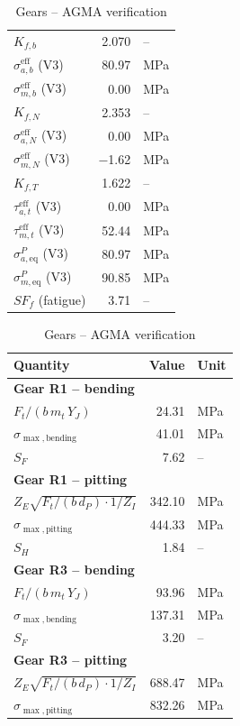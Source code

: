 \documentclass[11pt,a4paper]{article}
\begin{document}
\begin{table}[H]
\begin{minipage}[t]{0.48\textwidth}
\begin{tabular}{lrl}
$K_{f,b}$ & 2.070 & -- \\
$\sigma_{a,b}^{\mathrm{eff}}$ (V3) & 80.97 & MPa \\
$\sigma_{m,b}^{\mathrm{eff}}$ (V3) & 0.00 & MPa \\
$K_{f,N}$ & 2.353 & -- \\
$\sigma_{a,N}^{\mathrm{eff}}$ (V3) & 0.00 & MPa \\
$\sigma_{m,N}^{\mathrm{eff}}$ (V3) & \ensuremath{-}1.62 & MPa \\
$K_{f,T}$ & 1.622 & -- \\
$\tau_{a,t}^{\mathrm{eff}}$ (V3) & 0.00 & MPa \\
$\tau_{m,t}^{\mathrm{eff}}$ (V3) & 52.44 & MPa \\
$\sigma_{a,\mathrm{eq}}^{P}$ (V3) & 80.97 & MPa \\
$\sigma_{m,\mathrm{eq}}^{P}$ (V3) & 90.85 & MPa \\
$SF_f$ (fatigue) & 3.71 & -- \\
\bottomrule
\end{tabular}
\end{minipage}\hfill
\begin{minipage}[t]{0.48\textwidth}\centering
\caption*{Gears -- AGMA verification}
\begin{tabular}{lrl}
\toprule
Quantity & Value & Unit \\
\midrule
\multicolumn{3}{l}{\textbf{Gear R1 -- bending}} \\
$F_t/(b\,m_t\,Y_J)$ & 24.31 & MPa \\
$\sigma_{\max,\mathrm{bending}}$ & 41.01 & MPa \\
$S_F$ & 7.62 & -- \\
\multicolumn{3}{l}{\textbf{Gear R1 -- pitting}} \\
$Z_E\sqrt{F_t/(b\,d_P)\cdot 1/Z_I}$ & 342.10 & MPa \\
$\sigma_{\max,\mathrm{pitting}}$ & 444.33 & MPa \\
$S_H$ & 1.84 & -- \\
\multicolumn{3}{l}{\textbf{Gear R3 -- bending}} \\
$F_t/(b\,m_t\,Y_J)$ & 93.96 & MPa \\
$\sigma_{\max,\mathrm{bending}}$ & 137.31 & MPa \\
$S_F$ & 3.20 & -- \\
\multicolumn{3}{l}{\textbf{Gear R3 -- pitting}} \\
$Z_E\sqrt{F_t/(b\,d_P)\cdot 1/Z_I}$ & 688.47 & MPa \\
$\sigma_{\max,\mathrm{pitting}}$ & 832.26 & MPa \\

\end{tabular}
\end{minipage}
\end{table}
\end{document}

